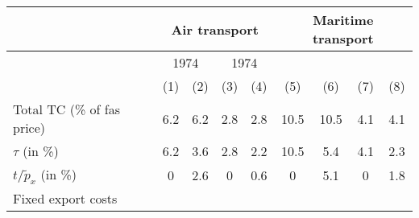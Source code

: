 \begin{tabular}{l|cc|cc|cc|cc}
& \multicolumn{4}{|c|}{Air transport} & \multicolumn{4}{|c}{Maritime transport} \\ \hline
& \multicolumn{2}{|c|}{1974} & \multicolumn{2}{c}{1974} \\
& (1) & (2) &  (3) & (4) & (5) & (6) &  (7) & (8)\\ \hline
Total TC (\% of fas price) & 6.2 & 6.2 & 2.8 & 2.8 & 10.5 & 10.5 & 4.1 & 4.1 \\
$\tau$ (in \%) & 6.2 & 3.6 & 2.8 & 2.2 & 10.5 & 5.4 & 4.1 & 2.3\\
$t/\widetilde{p}_x$ (in \%) & 0 & 2.6 & 0 & 0.6 & 0 & 5.1 & 0 & 1.8\\ \hline
\multicolumn{9}{l}{Fixed export costs} \hline
\hline \hline
\end{tabular} 